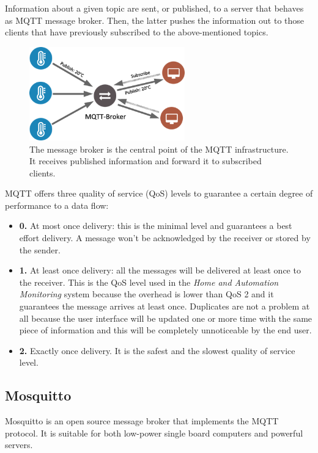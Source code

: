 Information about a given topic are sent, or published, to a server that behaves as MQTT message broker. Then, the latter pushes the information out to those clients that have previously subscribed to the above-mentioned topics.

\begin{figure}[H]
	\begin{center}
		\includegraphics[width=0.6\textwidth]{./pictures/mqtt.png}
		\caption{The message broker is the central point of the MQTT infrastructure. It receives published information and forward it to subscribed clients.}
		\label{mqtt_functioning}
	\end{center}
\end{figure}

\noindent
MQTT offers three quality of service (QoS) levels to guarantee a certain degree of performance to a data flow:

\begin{itemize}
	\item \textbf{0.} At most once delivery: this is the minimal level and guarantees a best effort delivery. A message won't be acknowledged by the receiver or stored by the sender.
	\item \textbf{1.} At least once delivery: all the messages will be delivered at least once to the receiver. This is the QoS level used in the \textit{Home and Automation Monitoring} system because the overhead is lower than QoS 2 and it guarantees the message arrives at least once. Duplicates are not a problem at all because the user interface will be updated one or more time with the same piece of information and this will be completely unnoticeable by the end user.
	\item \textbf{2.} Exactly once delivery. It is the safest and the slowest quality of service level.
\end{itemize}

\subsection{Mosquitto}
Mosquitto is an open source message broker that implements the MQTT protocol. It is suitable for both low-power single board computers and powerful servers.


